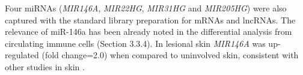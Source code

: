 Four miRNAs (\textit{MIR146A}, \textit{MIR22HG}, \textit{MIR31HG} and \textit{MIR205HG}) were also captured with the standard library preparation for mRNAs and lncRNAs. The relevance of miR-146a has been already noted in the differential analysis from circulating immune cells (Section 3.3.4). In lesional skin \textit{MIR146A} was up-regulated (fold change=2.0) when compared to uninvolved skin, consistent with other studies in skin \parencite{Lerman2011, Tsoi2015}. %





